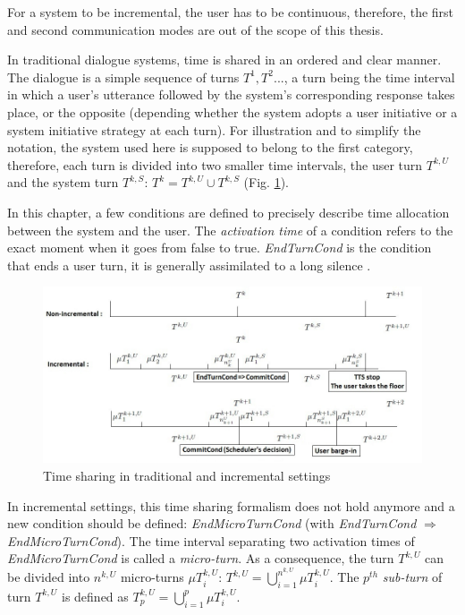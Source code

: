         For a system to be incremental, the user has to be continuous, therefore, the first and second communication modes are out of the scope of this thesis.
    
    
    	In traditional dialogue systems, time is shared in an ordered and clear manner. The dialogue is a simple sequence of turns $T^1,T^2...$, a turn being the time interval in which a user's utterance followed by the system's corresponding response takes place, or the opposite (depending whether the system adopts a user initiative or a system initiative strategy at each turn). For illustration and to simplify the notation, the system used here is supposed to belong to the first category, therefore, each turn is divided into two smaller time intervals, the user turn $T^{k,U}$ and the system turn $T^{k,S}$: $T^k = T^{k,U} \cup T^{k,S}$ (Fig. \ref{fig:timeshare}).
        
        In this chapter, a few conditions are defined to precisely describe time allocation between the system and the user. The \textit{activation time} of a condition refers to the exact moment when it goes from false to true. \textit{EndTurnCond} is the condition that ends a user turn, it is generally assimilated to a long silence \cite{Raux2008,Wlodarczak2013}.
        
        \begin{figure}[t]
          \centering
          \includegraphics[scale=0.6]{figures/Timeline.jpg}
          \caption{Time sharing in traditional and incremental settings}
          \label{fig:timeshare}
        \end{figure}
        
        In incremental settings, this time sharing formalism does not hold anymore and a new condition should be defined: \textit{EndMicroTurnCond} (with \textit{EndTurnCond} $\Rightarrow$ \textit{EndMicroTurnCond}). The time interval separating two activation times of \textit{EndMicroTurnCond} is called a \textit{micro-turn}. As a consequence, the turn $T^{k,U}$ can be divided into $n^{k,U}$ micro-turns $\mu T^{k,U}_i$: $T^{k,U} = \bigcup_{i=1}^{n^{k,U}} \mu T^{k,U}_i$. The $p^{th}$ \textit{sub-turn} of turn $T^{k,U}$ is defined as $T^{k,U}_p = \bigcup_{i=1}^p \mu T^{k,U}_i$.
        

